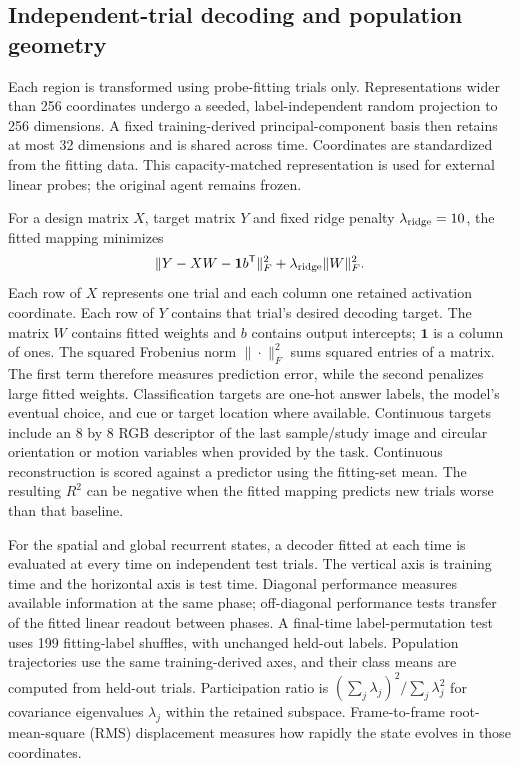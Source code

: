 \documentclass[11pt]{article}
\begin{document}
\subsection{Independent-trial decoding and population geometry}
Each region is transformed using probe-fitting trials only. Representations wider than 256 coordinates undergo a seeded, label-independent random projection to 256 dimensions. A fixed training-derived principal-component basis then retains at most 32 dimensions and is shared across time. Coordinates are standardized from the fitting data. This capacity-matched representation is used for external linear probes; the original agent remains frozen.

For a design matrix $X$, target matrix $Y$ and fixed ridge penalty $\lambda_{\rm ridge}=10$, the fitted mapping minimizes
\begin{equation}
 \|Y-XW-\mathbf 1 b^{\mathsf T}\|_F^2+\lambda_{\rm ridge}\|W\|_F^2.
\end{equation}
Each row of $X$ represents one trial and each column one retained activation coordinate. Each row of $Y$ contains that trial's desired decoding target. The matrix $W$ contains fitted weights and $b$ contains output intercepts; $\mathbf 1$ is a column of ones. The squared Frobenius norm $\|\cdot\|_F^2$ sums squared entries of a matrix. The first term therefore measures prediction error, while the second penalizes large fitted weights. Classification targets are one-hot answer labels, the model's eventual choice, and cue or target location where available. Continuous targets include an 8 by 8 RGB descriptor of the last sample/study image and circular orientation or motion variables when provided by the task. Continuous reconstruction is scored against a predictor using the fitting-set mean. The resulting $R^2$ can be negative when the fitted mapping predicts new trials worse than that baseline.

For the spatial and global recurrent states, a decoder fitted at each time is evaluated at every time on independent test trials. The vertical axis is training time and the horizontal axis is test time. Diagonal performance measures available information at the same phase; off-diagonal performance tests transfer of the fitted linear readout between phases. A final-time label-permutation test uses 199 fitting-label shuffles, with unchanged held-out labels. Population trajectories use the same training-derived axes, and their class means are computed from held-out trials. Participation ratio is $(\sum_j\lambda_j)^2/\sum_j\lambda_j^2$ for covariance eigenvalues $\lambda_j$ within the retained subspace. Frame-to-frame root-mean-square (RMS) displacement measures how rapidly the state evolves in those coordinates.
\end{document}
